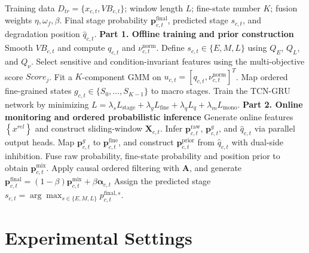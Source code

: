 \documentclass[a4paper,fleqn]{cas-sc}
\begin{document}
  \begin{algorithm}[htbp]
    \caption{DC-PSR for Cross-Condition Tool Wear Monitoring}
    \label{alg:dcpsr}
    \begin{algorithmic}[1]
      \Require Training data $D_{tr}=\{x_{c,t},VB_{c,t}\}$; window length $L$; fine-state number $K$; fusion weights $\eta,\omega_{f},\beta$.
      \Ensure Final stage probability $\mathbf{p}_{c,t}^{\mathrm{final}}$, predicted stage $s_{c,t}$, and degradation position $\hat{q}_{c,t}$.
      \Statex \textbf{{Part 1. Offline training and prior construction}}
      \State Smooth $VB_{c,t}$ and compute $q_{c,t}$ and $\nu_{c,t}^{\mathrm{norm}}$.
      \State Define $s_{c,t}\in \{E,M,L\}$ using $Q_{E}$, $Q_{L}$, and $Q_{\nu}$.
      \EndFor
      \State Select sensitive and condition-invariant features using the multi-objective score $Score_{j}$.
      \State Fit a $K$-component GMM on $u_{c,t}=[q_{c,t},\nu_{c,t}^{\mathrm{norm}}]^{T}$.
      \State Map ordered fine-grained states $g_{c,t}\in \{S_{0},\ldots,S_{K-1}\}$ to macro stages.
      \State Train the TCN-GRU network by minimizing $L=\lambda_{s}L_{\mathrm{stage}}+\lambda_{g}L_{\mathrm{fine}}+\lambda_{q}L_q+\lambda_{m}L_{\mathrm{mono}}$.
      \Statex \textbf{{Part 2. Online monitoring and ordered probabilistic inference}}
      \State Generate online features $\left\{x^{rel}\right\}$ and construct sliding-window $\mathbf{X}_{c,t}$.
      \State Infer $\mathbf{p}_{c,t}^{\mathrm{raw}}$, $\mathbf{p}_{c,t}^{g}$, and $\hat{q}_{c,t}$ via parallel output heads.
      \State Map $\mathbf{p}_{c,t}^{g}$ to $\mathbf{p}_{c,t}^{\mathrm{fine}}$, and construct $\mathbf{p}_{c,t}^{\mathrm{prior}}$ from $\hat{q}_{c,t}$ with dual-side inhibition.
      \State Fuse raw probability, fine-state probability and position prior to obtain $\mathbf{p}_{c,t}^{\mathrm{mix}}$.
      \State Apply causal ordered filtering with $\mathbf{A}$, and generate $\mathbf{p}_{c,t}^{\mathrm{final}}=\left(1-\beta\right)\mathbf{p}_{c,t}^{\mathrm{mix}}+\beta\boldsymbol{\alpha}_{c,t}$
      \State Assign the predicted stage $s_{c,t}=\arg\max_{s\in \{E,M,L\}}p_{c,t}^{\mathrm{final},s}$.
      \EndFor
    \end{algorithmic}
  \end{algorithm}
  \section{Experimental Settings}
\label{sec:experiments}
\end{document}
